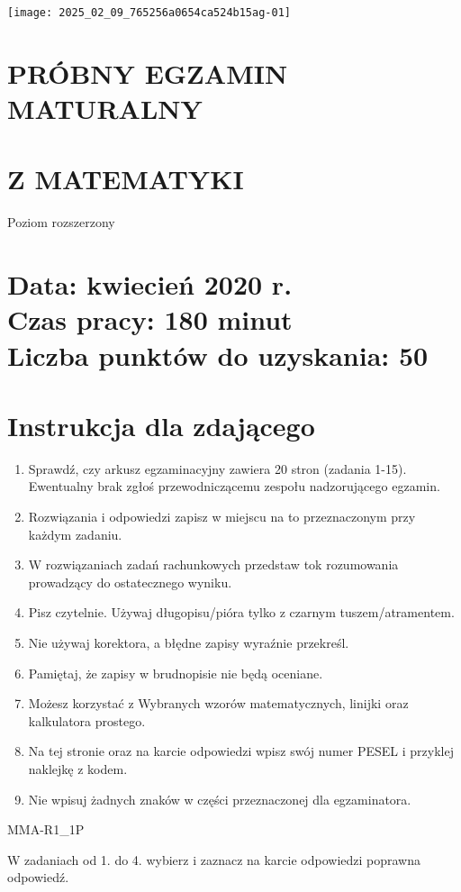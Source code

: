 \documentclass[10pt]{article}
\begin{document}
\begin{center}
\texttt{[image: 2025\_02\_09\_765256a0654ca524b15ag-01]}
\end{center}

\section*{PRÓBNY EGZAMIN MATURALNY}
\section*{Z MATEMATYKI}
Poziom rozszerzony

\section*{Data: kwiecień 2020 r. \\
 Czas pracy: 180 minut \\
 Liczba punktów do uzyskania: \(\mathbf{5 0}\)}
\section*{Instrukcja dla zdającego}
\begin{enumerate}
  \item Sprawdź, czy arkusz egzaminacyjny zawiera 20 stron (zadania 1-15). Ewentualny brak zgłoś przewodniczącemu zespołu nadzorującego egzamin.
  \item Rozwiązania i odpowiedzi zapisz w miejscu na to przeznaczonym przy każdym zadaniu.
  \item W rozwiązaniach zadań rachunkowych przedstaw tok rozumowania prowadzący do ostatecznego wyniku.
  \item Pisz czytelnie. Używaj długopisu/pióra tylko z czarnym tuszem/atramentem.
  \item Nie używaj korektora, a błędne zapisy wyraźnie przekreśl.
  \item Pamiętaj, że zapisy w brudnopisie nie będą oceniane.
  \item Możesz korzystać z Wybranych wzorów matematycznych, linijki oraz kalkulatora prostego.
  \item Na tej stronie oraz na karcie odpowiedzi wpisz swój numer PESEL i przyklej naklejkę z kodem.
  \item Nie wpisuj żadnych znaków w części przeznaczonej dla egzaminatora.
\end{enumerate}

MMA-R1\_1P

W zadaniach od 1. do 4. wybierz i zaznacz na karcie odpowiedzi poprawna odpowiedź.
\end{document}
